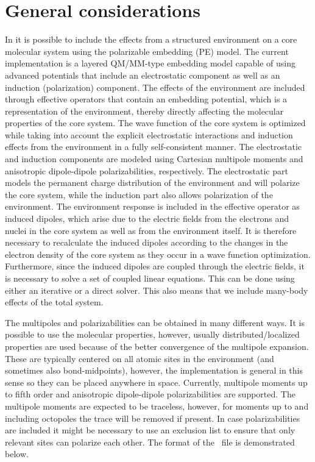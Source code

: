 \section{General considerations}
In {\dalton} it is possible to include the effects from a structured
environment on a core molecular system using the polarizable embedding (PE) 
model. The current implementation is a layered QM/MM-type embedding model
capable of using advanced potentials that include an electrostatic component as 
well as an induction (polarization) component. The effects of the environment 
are included through effective operators that contain an embedding potential, 
which is a representation of the environment, thereby directly affecting the 
molecular properties of the core system. The wave function of the core system 
is optimized while taking into account the explicit electrostatic interactions 
and induction effects from the environment in a fully self-consistent manner. 
The electrostatic and induction components are modeled using Cartesian 
multipole moments and anisotropic dipole-dipole polarizabilities, respectively.
The electrostatic part models the permanent charge distribution of the 
environment and will polarize the core system, while the induction part also 
allows polarization of the environment. The environment response is included in 
the effective operator as induced dipoles, which arise due to the electric
fields from the electrons and nuclei in the core system as well as from the 
environment itself. It is therefore necessary to recalculate the induced dipoles
according to the changes in the electron density of the core system as they
occur in a wave function optimization. Furthermore, since the induced dipoles
are coupled through the electric fields, it is necessary to solve a set of
coupled linear equations. This can be done using either an iterative or a 
direct solver. This also means that we include many-body effects of the total system.

The multipoles and polarizabilities can be obtained in many different ways. It 
is possible to use the molecular properties, however, usually 
distributed/localized properties are used because of the better convergence of 
the multipole expansion. These are typically centered on all atomic sites in 
the environment (and sometimes also bond-midpoints), however, the 
implementation is general in this sense so they can be placed anywhere in 
space. Currently, multipole moments up to fifth order and anisotropic 
dipole-dipole polarizabilities are supported. The multipole moments are 
expected to be traceless, however, for moments up to and including octopoles 
the trace will be removed if present. In case polarizabilities are included it 
might be necessary to use an exclusion list to ensure that only relevant sites 
can polarize each other. The format of the \potinp\ file is demonstrated below.

